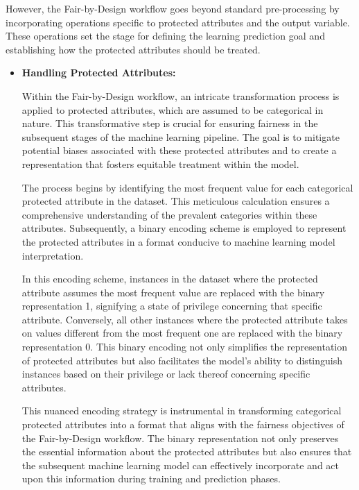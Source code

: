 \documentclass[12pt,a4paper,openright,twoside]{book}
\begin{document}
However, the Fair-by-Design workflow goes beyond standard pre-processing by incorporating operations specific to protected attributes and the output variable. These operations set the stage for defining the learning prediction goal and establishing how the protected attributes should be treated.

\begin{itemize}
    
    \item \textbf{Handling Protected Attributes:} 
    
    Within the Fair-by-Design workflow, an intricate transformation process is applied to protected attributes, which are assumed to be categorical in nature. This transformative step is crucial for ensuring fairness in the subsequent stages of the machine learning pipeline. The goal is to mitigate potential biases associated with these protected attributes and to create a representation that fosters equitable treatment within the model.

    The process begins by identifying the most frequent value for each categorical protected attribute in the dataset. This meticulous calculation ensures a comprehensive understanding of the prevalent categories within these attributes. Subsequently, a binary encoding scheme is employed to represent the protected attributes in a format conducive to machine learning model interpretation.

    In this encoding scheme, instances in the dataset where the protected attribute assumes the most frequent value are replaced with the binary representation 1, signifying a state of privilege concerning that specific attribute. Conversely, all other instances where the protected attribute takes on values different from the most frequent one are replaced with the binary representation 0. This binary encoding not only simplifies the representation of protected attributes but also facilitates the model's ability to distinguish instances based on their privilege or lack thereof concerning specific attributes.

    This nuanced encoding strategy is instrumental in transforming categorical protected attributes into a format that aligns with the fairness objectives of the Fair-by-Design workflow. The binary representation not only preserves the essential information about the protected attributes but also ensures that the subsequent machine learning model can effectively incorporate and act upon this information during training and prediction phases.


\end{itemize}
\end{document}
